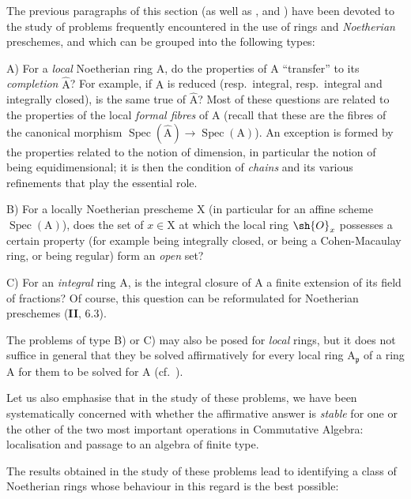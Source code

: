\begin{env}[7.8.1]
\label{IV.7.8.1}
The previous paragraphs of this section (as well as ,  and ) have been devoted to the study of problems frequently encountered in the use of rings and \emph{Noetherian} preschemes, and which can be grouped into the following types:


A) For a \emph{local} Noetherian ring $\mathrm{A}$, do the properties of $\mathrm{A}$ ``transfer'' to its \emph{completion} $\widehat{\mathrm{A}}$? For example, if $\mathrm{A}$ is reduced (resp.\ integral, resp.\ integral and integrally closed), is the same true of $\widehat{\mathrm{A}}$? Most of these questions are related to the properties of the local \emph{formal fibres} of $\mathrm{A}$ (recall that these are the fibres of the canonical morphism $\operatorname{Spec}(\widehat{\mathrm{A}})\to\operatorname{Spec}(\mathrm{A})$). An exception is formed by the properties related to the notion of dimension, in particular the notion of being equidimensional; it is then the condition of \emph{chains} and its various refinements that play the essential role.

B) For a locally Noetherian prescheme $\mathrm{X}$ (in particular for an affine scheme $\operatorname{Spec}(\mathrm{A})$), does the set of $x\in\mathrm{X}$ at which the local ring $\sh{O}_x$ possesses a certain property (for example being integrally closed, or being a Cohen-Macaulay ring, or being regular) form an \emph{open} set?

C) For an \emph{integral} ring $\mathrm{A}$, is the integral closure of $\mathrm{A}$ a finite extension of its field of fractions? Of course, this question can be reformulated for Noetherian preschemes (\textbf{II}, $6.3$).

The problems of type B) or C) may also be posed for \emph{local} rings, but it does not suffice in general that they be solved affirmatively for every local ring $\mathrm{A}_\mathfrak{p}$ of a ring $\mathrm{A}$ for them to be solved for $\mathrm{A}$ (cf.\ ).

Let us also emphasise that in the study of these problems, we have been systematically concerned with whether the affirmative answer is \emph{stable} for one or the other of the two most important operations in Commutative Algebra: localisation and passage to an algebra of finite type.

The results obtained in the study of these problems lead to identifying a class of Noetherian rings whose behaviour in this regard is the best possible:
\end{env}

